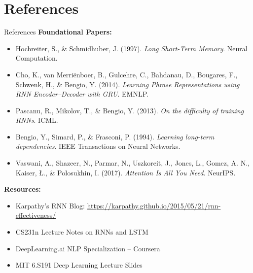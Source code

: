 \section{References}
\begin{frame}[allowframebreaks]{References}
    \textbf{Foundational Papers:}
    \begin{itemize}
        \item Hochreiter, S., \& Schmidhuber, J. (1997). \textit{Long Short-Term Memory}. Neural Computation.
        \item Cho, K., van Merriënboer, B., Gulcehre, C., Bahdanau, D., Bougares, F., Schwenk, H., \& Bengio, Y. (2014). \textit{Learning Phrase Representations using RNN Encoder–Decoder with GRU}. EMNLP.
        \item Pascanu, R., Mikolov, T., \& Bengio, Y. (2013). \textit{On the difficulty of training RNNs}. ICML.
        \item Bengio, Y., Simard, P., \& Frasconi, P. (1994). \textit{Learning long-term dependencies}. IEEE Transactions on Neural Networks.
        \item Vaswani, A., Shazeer, N., Parmar, N., Uszkoreit, J., Jones, L., Gomez, A. N., Kaiser, Ł., \& Polosukhin, I. (2017). \textit{Attention Is All You Need}. NeurIPS.
    \end{itemize}

    \framebreak

    \textbf{Resources:}
    \begin{itemize}
        \item Karpathy’s RNN Blog: \url{https://karpathy.github.io/2015/05/21/rnn-effectiveness/}
        \item CS231n Lecture Notes on RNNs and LSTM
        \item DeepLearning.ai NLP Specialization – Coursera
        \item MIT 6.S191 Deep Learning Lecture Slides
    \end{itemize}
\end{frame}